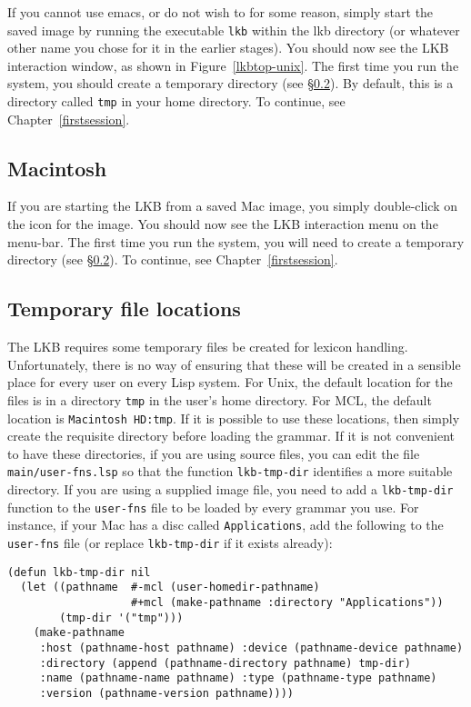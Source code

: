 \documentclass[12pt]{report}
\begin{document}
If you cannot use emacs, or do not wish to for some reason,
simply start the saved image by running the executable
{\tt lkb} within the lkb directory (or whatever
other name you chose for it in the earlier stages).
You
should now see the LKB interaction window, as shown in 
Figure~\ref{lkbtop-unix}.
The first time you run the system, you should
create a temporary directory (see \S\ref{tempdir}).  By default, this is
a directory called {\tt tmp} in your home directory.
To continue, see Chapter~\ref{firstsession}.

\subsection{Macintosh}
\label{mcl-image}

If you are starting the LKB from a saved
Mac image, you simply double-click on the
icon for the image. 
You
should now see the LKB interaction menu on the menu-bar. 
The first time you run the system, you will need to
create a temporary directory (see \S\ref{tempdir}).
To continue, see Chapter~\ref{firstsession}.


\subsection{Temporary file locations}
\label{tempdir}

The LKB requires some temporary files be created for lexicon handling.  
Unfortunately, there is no way of ensuring that these will be created 
in a sensible place for every user on every Lisp system.
For
Unix, the default location for the
files is in a directory {\tt tmp} in the user's
home directory.  For MCL, the default location is {\tt Macintosh HD:tmp}.  If
it is possible to use these locations, then simply create the requisite
directory before loading the grammar.  If it is not convenient to have these
directories, if you are using source files, you can edit the file {\tt
main/user-fns.lsp} so that the function {\tt lkb-tmp-dir} identifies a more
suitable directory.  If you are using a supplied image file, you need to add a
{\tt lkb-tmp-dir} 
function to the {\tt user-fns} file to be loaded by every grammar 
you use.  For instance,
if your Mac has a disc called {\tt Applications}, add the following
to the {\tt user-fns} file (or replace {\tt lkb-tmp-dir} if it exists
already):
\begin{verbatim}
(defun lkb-tmp-dir nil 
  (let ((pathname  #-mcl (user-homedir-pathname)
                   #+mcl (make-pathname :directory "Applications"))
        (tmp-dir '("tmp")))
    (make-pathname
     :host (pathname-host pathname) :device (pathname-device pathname)
     :directory (append (pathname-directory pathname) tmp-dir)
     :name (pathname-name pathname) :type (pathname-type pathname)
     :version (pathname-version pathname))))
\end{verbatim}
\end{document}
